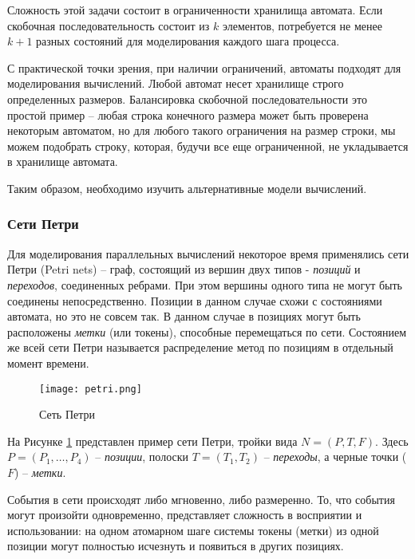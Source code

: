 \documentclass[a4paper,14pt]{extreport} %
\begin{document}
Сложность этой задачи состоит в ограниченности хранилища автомата. Если скобочная последовательность состоит из $k$ элементов, потребуется не менее $k+1$ разных состояний для моделирования каждого шага процесса.

С практической точки зрения, при наличии ограничений, автоматы подходят для моделирования вычислений. Любой автомат несет хранилище строго определенных размеров. Балансировка скобочной последовательности это простой пример -- любая строка конечного размера может быть проверена некоторым автоматом, но для любого такого ограничения на размер строки, мы можем подобрать строку, которая, будучи все еще ограниченной, не укладывается в хранилище автомата.

Таким образом, необходимо изучить альтернативные модели вычислений.


{\subsubsection{Сети Петри}}

Для моделирования параллельных вычислений некоторое время применялись сети Петри (Petri nets) -- граф, состоящий из вершин двух типов - \textit{позиций} и \textit{переходов}, соединенных ребрами. При этом вершины одного типа не могут быть соединены непосредственно. Позиции в данном случае схожи с состояниями автомата, но это не совсем так. В данном случае в позициях могут быть расположены \textit{метки} (или токены), способные перемещаться по сети. Состоянием же всей сети Петри называется распределение метод по позициям в отдельный момент времени.

\begin{figure}[h]
\centering
\texttt{[image: petri.png]}
\caption{Сеть Петри}
\label{petri}
\end{figure}

На Рисунке \ref{petri} представлен пример сети Петри, тройки вида $N = (P,T,F)$. Здесь $P=(P_1, \dots, P_4)$ -- \textit{позиции}, полоски $T=(T_1, T_2)$ -- \textit{переходы}, а черные точки ($F$) -- \textit{метки}.

События в сети происходят либо мгновенно, либо размеренно. То, что события могут произойти одновременно, представляет сложность в восприятии и использовании: на одном атомарном шаге системы токены (метки) из одной позиции могут полностью исчезнуть и появиться в других позициях.
\end{document}
